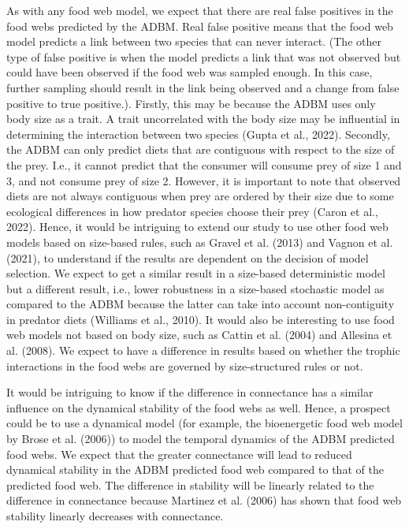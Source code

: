 \documentclass{article}
\begin{document}
As with any food web model, we expect that there are real false
positives in the food webs predicted by the ADBM. Real false positive
means that the food web model predicts a link between two species that
can never interact. (The other type of false positive is when the model
predicts a link that was not observed but could have been observed if
the food web was sampled enough. In this case, further sampling should
result in the link being observed and a change from false positive to
true positive.). Firstly, this may be because the ADBM uses only body
size as a trait. A trait uncorrelated with the body size may be
influential in determining the interaction between two species (Gupta et
al., 2022). Secondly, the ADBM can only predict diets that are
contiguous with respect to the size of the prey. I.e., it cannot predict
that the consumer will consume prey of size 1 and 3, and not consume
prey of size 2. However, it is important to note that observed diets are
not always contiguous when prey are ordered by their size due to some
ecological differences in how predator species choose their prey (Caron
et al., 2022). Hence, it would be intriguing to extend our study to use
other food web models based on size-based rules, such as Gravel et al.
(2013) and Vagnon et al. (2021), to understand if the results are
dependent on the decision of model selection. We expect to get a similar
result in a size-based deterministic model but a different result, i.e.,
lower robustness in a size-based stochastic model as compared to the
ADBM because the latter can take into account non-contiguity in predator
diets (Williams et al., 2010). It would also be interesting to use food
web models not based on body size, such as Cattin et al. (2004) and
Allesina et al. (2008). We expect to have a difference in results based
on whether the trophic interactions in the food webs are governed by
size-structured rules or not.

It would be intriguing to know if the difference in connectance has a
similar influence on the dynamical stability of the food webs as well.
Hence, a prospect could be to use a dynamical model (for example, the
bioenergetic food web model by Brose et al. (2006)) to model the
temporal dynamics of the ADBM predicted food webs. We expect that the
greater connectance will lead to reduced dynamical stability in the ADBM
predicted food web compared to that of the predicted food web. The
difference in stability will be linearly related to the difference in
connectance because Martinez et al. (2006) has shown that food web
stability linearly decreases with connectance.
\end{document}
